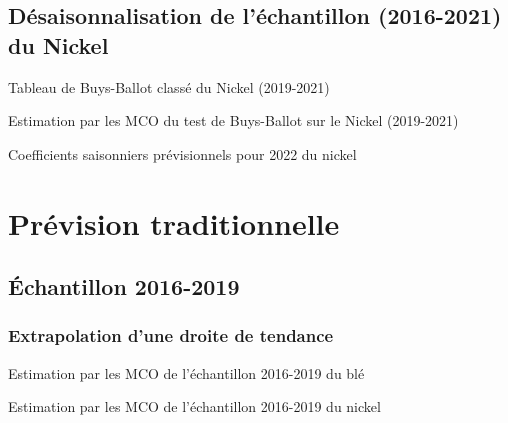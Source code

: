 \documentclass[12pt,a4paper]{article}
\begin{document}
\subsection{Désaisonnalisation de l'échantillon (2016-2021) du Nickel}
\begin{table}[H]
    \centering
    \caption{Tableau de Buys-Ballot classé du Nickel (2019-2021)}
    \sffamily
    \label{tab:bbc}
    \resizebox{\textwidth}{!}{}
\end{table}

\begin{table}[H]
    \centering
    \caption{Estimation par les MCO du test de Buys-Ballot sur le Nickel (2019-2021)}
    \sffamily
    \label{tab:bb_test}
    
\end{table}

\begin{table}[H]
    \centering
    \caption{Coefficients saisonniers prévisionnels pour 2022 du nickel}
    \sffamily
    \label{tab:coef_saiso}
    
\end{table}

\section{Prévision traditionnelle}
\setcounter{table}{0}
\setcounter{figure}{0}
\subsection{Échantillon 2016-2019}
\subsubsection{Extrapolation d'une droite de tendance}
\begin{table}[H]
    \centering
    \caption{Estimation par les MCO de l'échantillon 2016-2019 du blé}
    \sffamily
    \label{tab:mco_ble19}
    
\end{table}

\begin{table}[H]
    \centering
    \caption{Estimation par les MCO de l'échantillon 2016-2019 du nickel}
    \sffamily
    \label{tab:mco_nickel19}
    
\end{table}
\end{document}
